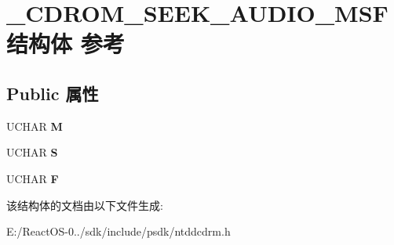 \hypertarget{struct___c_d_r_o_m___s_e_e_k___a_u_d_i_o___m_s_f}{}\section{\+\_\+\+C\+D\+R\+O\+M\+\_\+\+S\+E\+E\+K\+\_\+\+A\+U\+D\+I\+O\+\_\+\+M\+S\+F结构体 参考}
\label{struct___c_d_r_o_m___s_e_e_k___a_u_d_i_o___m_s_f}
\subsection*{Public 属性}
\begin{DoxyCompactItemize}
\item 
\mbox{\label{struct___c_d_r_o_m___s_e_e_k___a_u_d_i_o___m_s_f_a2ba026dfcbdfccb1e94c97b8d3befa2f}} 
U\+C\+H\+AR {\bfseries M}
\item 
\mbox{\label{struct___c_d_r_o_m___s_e_e_k___a_u_d_i_o___m_s_f_aff552d363dae51f6f68873078b7d1c56}} 
U\+C\+H\+AR {\bfseries S}
\item 
\mbox{\label{struct___c_d_r_o_m___s_e_e_k___a_u_d_i_o___m_s_f_a94da2b4db94800c397d12d666acd0e05}} 
U\+C\+H\+AR {\bfseries F}
\end{DoxyCompactItemize}


该结构体的文档由以下文件生成\+:\begin{DoxyCompactItemize}
\item 
E\+:/\+React\+O\+S-\/0../sdk/include/psdk/ntddcdrm.\+h\end{DoxyCompactItemize}
